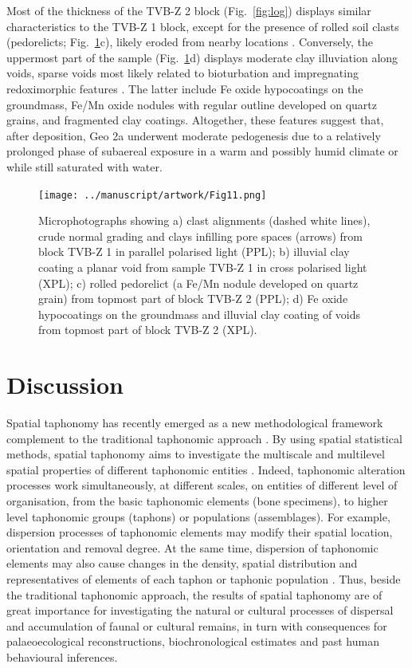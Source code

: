 \documentclass[5p,times,authoryear]{elsarticle}
\begin{document}
Most of the thickness of the TVB-Z 2 block (Fig.~\ref{fig:log}) displays similar characteristics to the TVB-Z 1 block, except for the presence of rolled soil clasts (pedorelicts; Fig.~\ref{fig:micro}c), likely eroded from nearby locations \citep{Cremaschi2018}. Conversely, the uppermost part of the sample (Fig.~\ref{fig:micro}d) displays moderate clay illuviation along voids, sparse voids most likely related to bioturbation and impregnating redoximorphic features \citep{Lindbo2010}. The latter include Fe oxide hypocoatings on the groundmass, Fe/Mn oxide nodules with regular outline developed on quartz grains, and fragmented clay coatings. Altogether, these features suggest that, after deposition, Geo 2a underwent moderate pedogenesis due to a relatively prolonged phase of subaereal exposure in a warm and possibly humid climate or while still saturated with water.

\begin{figure}
  \centering
  \texttt{[image: ../manuscript/artwork/Fig11.png]}
  \caption{Microphotographs showing a) clast alignments (dashed white lines), crude normal grading and clays infilling pore spaces (arrows) from block TVB-Z 1 in parallel polarised light (PPL); b) illuvial clay coating a planar void from sample TVB-Z 1 in cross polarised light (XPL); c) rolled pedorelict (a Fe/Mn nodule developed on quartz grain) from topmost part of block TVB-Z 2 (PPL); d) Fe oxide hypocoatings on the groundmass and illuvial clay coating of voids from topmost part of block TVB-Z 2 (XPL).}
  \label{fig:micro}
\end{figure}

\section{Discussion}

Spatial taphonomy has recently emerged as a new methodological framework complement to the traditional taphonomic approach \citep{Dominguez-Rodrigo2017}. By using spatial statistical methods, spatial taphonomy aims to investigate the multiscale and multilevel spatial properties of different taphonomic entities \citep[\emph{sensu}][]{Fernandez-Lopez2006}. Indeed, taphonomic alteration processes work simultaneously, at different scales, on entities of different level of organisation, from the basic taphonomic elements (bone specimens), to higher level taphonomic groups (taphons) or populations (assemblages). For example, dispersion processes of taphonomic elements may modify their spatial location, orientation and removal degree. At the same time, dispersion of taphonomic elements may also cause changes in the density, spatial distribution and representatives of elements of each taphon or taphonic population \citep{Fernandez-Lopez2006}. Thus, beside the traditional taphonomic approach, the results of spatial taphonomy are of great importance for investigating the natural or cultural processes of dispersal and accumulation of faunal or cultural remains, in turn with consequences for palaeoecological reconstructions, biochronological estimates and past human behavioural inferences.
\end{document}
